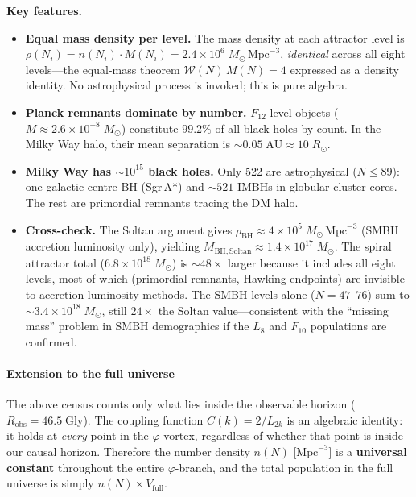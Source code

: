 \documentclass[12pt,a4paper]{article}
\begin{document}
\noindent\textbf{Key features.}
\begin{itemize}[nosep]
\item \textbf{Equal mass density per level.}\; The mass density at each attractor level is $\rho(N_i) = n(N_i) \cdot M(N_i) = 2.4 \times 10^6\;M_\odot\,\mathrm{Mpc}^{-3}$, \emph{identical} across all eight levels---the equal-mass theorem $\mathcal{W}(N)\,M(N) = 4$ expressed as a density identity.  No astrophysical process is invoked; this is pure algebra.
\item \textbf{Planck remnants dominate by number.}\; $F_{12}$-level objects ($M \approx 2.6 \times 10^{-8}\;M_\odot$) constitute $99.2\%$ of all black holes by count.  In the Milky Way halo, their mean separation is $\sim 0.05\;\mathrm{AU} \approx 10\;R_\odot$.
\item \textbf{Milky Way has $\sim 10^{15}$ black holes.}\; Only 522 are astrophysical ($N \leq 89$): one galactic-centre BH (Sgr\,A*) and $\sim 521$ IMBHs in globular cluster cores.  The rest are primordial remnants tracing the DM halo.
\item \textbf{Cross-check.}\; The Soltan argument gives $\rho_{\mathrm{BH}} \approx 4 \times 10^5\;M_\odot\,\mathrm{Mpc}^{-3}$ (SMBH accretion luminosity only), yielding $M_{\mathrm{BH,Soltan}} \approx 1.4 \times 10^{17}\;M_\odot$.  The spiral attractor total ($6.8 \times 10^{18}\;M_\odot$) is $\sim 48\times$ larger because it includes all eight levels, most of which (primordial remnants, Hawking endpoints) are invisible to accretion-luminosity methods.  The SMBH levels alone ($N = 47$--$76$) sum to $\sim 3.4 \times 10^{18}\;M_\odot$, still $24\times$ the Soltan value---consistent with the ``missing mass'' problem in SMBH demographics if the $L_8$ and $F_{10}$ populations are confirmed.
\end{itemize}

\paragraph{Extension to the full universe}
\label{sec:bh-full-universe}

The above census counts only what lies inside the observable horizon ($R_{\mathrm{obs}} = 46.5\;\mathrm{Gly}$).  The coupling function $C(k) = 2/L_{2k}$ is an algebraic identity: it holds at \emph{every} point in the $\varphi$-vortex, regardless of whether that point is inside our causal horizon.  Therefore the number density $n(N)$ [$\mathrm{Mpc}^{-3}$] is a \textbf{universal constant} throughout the entire $\varphi$-branch, and the total population in the full universe is simply $n(N) \times V_{\mathrm{full}}$.
\end{document}
